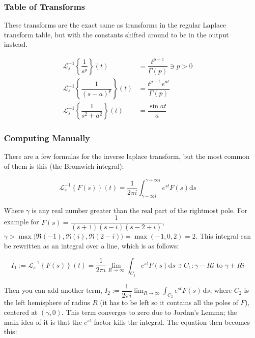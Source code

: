\documentclass[12pt]{article}
\newcommand \dstyle \displaystyle
\newcommand \ILaplace [3] {\ensuremath{\mathscr{L}_{#1}^{-1}\!\left\{#2\right\}\!\left(#3\right)}}
\renewcommand \d [1] {\mathrm{d}{#1}}
\newcommand \ds {{\d s}}
\begin{document}
\subsubsection{Table of Transforms}\label{sec:ilaplace-table}

These transforms are the exact same as transforms in the regular Laplace transform table, but with the constants shifted around to be in the output instead.

\begin{align}
	\ILaplace{s}{\dfrac 1 {s^p}}{t} & = \dfrac{t^{p - 1}}{\Gamma(p)} \ni p > 0 \\
	\ILaplace{s}{\dfrac 1 {(s - a)^p}}{t} & = \dfrac{t^{p - 1} e^{at}}{\Gamma(p)} \\
	\ILaplace{s}{\dfrac 1 {s^2 + a^2}}{t} & = \dfrac{\sin a t} a
\end{align}

\subsubsection{Computing Manually}\label{sec:ilaplace-compute} 

There are a few formulas for the inverse laplace transform, but the most common of them is this (the Bromwich integral):

\begin{equation}
	\ILaplace{s}{F(s)}{t} = \dfrac 1 {2 \pi i} \int_{\gamma - \infty i}^{\gamma + \infty i} e^{s t} F(s) \ds
\end{equation}

Where $\gamma$ is any real number greater than the real part of the rightmost pole. For example for $F(s) = \dfrac 1 {(s + 1)(s - i) (s - 2 + i)}$, $\gamma > \max\Big(\Re(-1), \Re(i), \Re(2 - i)\Big) = \max(-1, 0, 2) = 2$. This integral can be rewritten as an integral over a line, which is as follows:

 {}
\begin{equation}
	I_1 := \ILaplace{s}{F(s)}{t} = \dfrac 1 {2 \pi i} \lim_{R \to \infty} \int_{C_1} e^{st} F(s) \ds \ni C_1 : \gamma - R i \text{ to } \gamma + R i
\end{equation}

Then you can add another term, $\dstyle I_2 := \dfrac 1 {2 \pi i} \lim_{R \to \infty} \int_{C_2} \!\! e^{st} F(s) \, \ds$, where $C_2$ is the left hemisphere of radius $R$ (it has to be left so it contains all the poles of $F$), centered at $(\gamma, 0)$. This term converges to zero due to Jordan's Lemma; the main idea of it is that the $\dstyle e^{st}$ factor kills the integral. The equation then becomes this:
\end{document}

